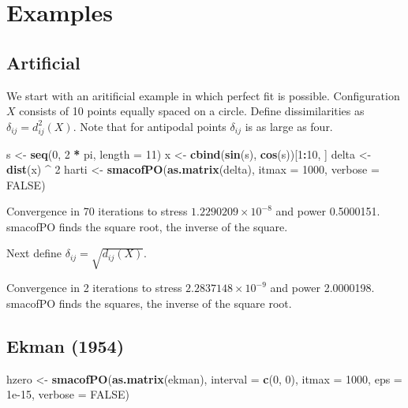 \documentclass[
  12pt,
]{article}
\newenvironment{Shaded}{\begin{snugshade}}{\end{snugshade}}
\newcommand{\AttributeTok}[1]{\textcolor[rgb]{0.13,0.29,0.53}{#1}}
\newcommand{\ConstantTok}[1]{\textcolor[rgb]{0.56,0.35,0.01}{#1}}
\newcommand{\DecValTok}[1]{\textcolor[rgb]{0.00,0.00,0.81}{#1}}
\newcommand{\FloatTok}[1]{\textcolor[rgb]{0.00,0.00,0.81}{#1}}
\newcommand{\FunctionTok}[1]{\textcolor[rgb]{0.13,0.29,0.53}{\textbf{#1}}}
\newcommand{\NormalTok}[1]{#1}
\newcommand{\OtherTok}[1]{\textcolor[rgb]{0.56,0.35,0.01}{#1}}
\newcommand{\SpecialCharTok}[1]{\textcolor[rgb]{0.81,0.36,0.00}{\textbf{#1}}}
\begin{document}
\section{Examples}\label{examples}

\subsection{Artificial}\label{artificial}

We start with an aritificial example in which perfect fit is possible. Configuration \(X\) consists of 10 points equally spaced on a circle. Define dissimilarities as \(\delta_{ij}=d_{ij}^2(X)\). Note that for antipodal
points \(\delta_{ij}\) is as large as four.

\begin{Shaded}
\begin{Highlighting}[]
\NormalTok{s }\OtherTok{\textless{}{-}} \FunctionTok{seq}\NormalTok{(}\DecValTok{0}\NormalTok{, }\DecValTok{2} \SpecialCharTok{*}\NormalTok{ pi, }\AttributeTok{length =} \DecValTok{11}\NormalTok{)}
\NormalTok{x }\OtherTok{\textless{}{-}} \FunctionTok{cbind}\NormalTok{(}\FunctionTok{sin}\NormalTok{(s), }\FunctionTok{cos}\NormalTok{(s))[}\DecValTok{1}\SpecialCharTok{:}\DecValTok{10}\NormalTok{, ]}
\NormalTok{delta }\OtherTok{\textless{}{-}} \FunctionTok{dist}\NormalTok{(x) }\SpecialCharTok{\^{}} \DecValTok{2}
\NormalTok{harti }\OtherTok{\textless{}{-}} \FunctionTok{smacofPO}\NormalTok{(}\FunctionTok{as.matrix}\NormalTok{(delta), }\AttributeTok{itmax =} \DecValTok{1000}\NormalTok{, }\AttributeTok{verbose =} \ConstantTok{FALSE}\NormalTok{)}
\end{Highlighting}
\end{Shaded}

Convergence in 70 iterations to stress \ensuremath{1.2290209\times 10^{-8}} and power 0.5000151. smacofPO finds the square root, the inverse of the square.

Next define \(\delta_{ij}=\sqrt{d_{ij}(X)}\).

Convergence in 2 iterations to stress \ensuremath{2.2837148\times 10^{-9}} and power 2.0000198. smacofPO finds the squares, the inverse of the square root.

\subsection{Ekman (1954)}\label{ekman_54}

\begin{Shaded}
\begin{Highlighting}[]
\NormalTok{hzero }\OtherTok{\textless{}{-}} \FunctionTok{smacofPO}\NormalTok{(}\FunctionTok{as.matrix}\NormalTok{(ekman), }\AttributeTok{interval =} \FunctionTok{c}\NormalTok{(}\DecValTok{0}\NormalTok{, }\DecValTok{0}\NormalTok{), }\AttributeTok{itmax =} \DecValTok{1000}\NormalTok{, }\AttributeTok{eps =} \FloatTok{1e{-}15}\NormalTok{, }\AttributeTok{verbose =} \ConstantTok{FALSE}\NormalTok{)}
\end{Highlighting}
\end{Shaded}
\end{document}
